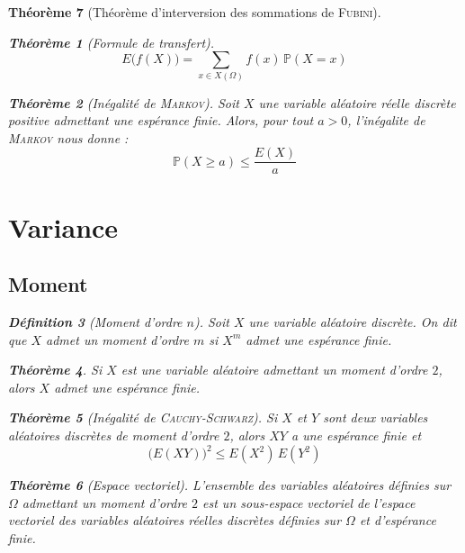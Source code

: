 \documentclass[11pt,a4paper]{report}
\newtheorem{theorem}{Théorème}[chapter]
\newtheorem{itheorem}[theorem]{Théorème}
\theoremstyle{definition}
\newtheorem{dfn}[theorem]{Définition}
\begin{document}
\begin{theorem}[Théorème d'interversion des sommations de \textsc{Fubini}]
{{\begin{itheorem}[Formule de transfert]
\begin{equation}
     E\big( f(X) \big) = \sum_{x\in X(\Omega)} f(x)\, \mathbb{P}(X=x)
     \end{equation}
\end{itheorem}
\begin{itheorem}[Inégalité de \textsc{Markov}]\label{thm:markov}
     Soit $X$ une variable aléatoire réelle discrète \emph{positive} admettant une espérance finie. Alors, pour tout $a > 0$, l'\emph{inégalite de \textsc{Markov}} nous donne : 
     \begin{equation}\label{eq:markov}
     \mathbb{P}(X\ge a) \le \dfrac{E(X)}{a}
     \end{equation}
\end{itheorem}


\section{Variance} %
\label{sec:variance}
\subsection{Moment} %
\label{sub:variance_moment}

\begin{dfn}[Moment d'ordre $n$]
     Soit $X$ une variable aléatoire discrète. On dit que $X$ admet un \emph{moment} d'ordre $m$ si $X^m$ admet \emph{une espérance finie}.
\end{dfn}
\begin{theorem}
     Si $X$ est une variable aléatoire admettant un moment d'ordre $2$, alors $X$ admet une espérance finie.
\end{theorem}
\begin{theorem}[Inégalité de \textsc{Cauchy-Schwarz}]
     Si $X$ et $Y$ sont deux variables aléatoires discrètes de moment d'ordre $2$, alors $XY$ a une espérance finie et
     \begin{equation}
     \bigg( E(XY)\bigg)^2 \le E(X^2)\,E(Y^2)
     \end{equation}
\end{theorem}
\begin{theorem}[Espace vectoriel]
     L'ensemble des variables aléatoires définies sur $\Omega$ admettant un moment d'ordre $2$ est un sous-espace vectoriel de l'espace vectoriel des variables aléatoires réelles discrètes définies sur $\Omega$ et d'espérance finie.
\end{theorem}

}}
\end{theorem}
\end{document}
